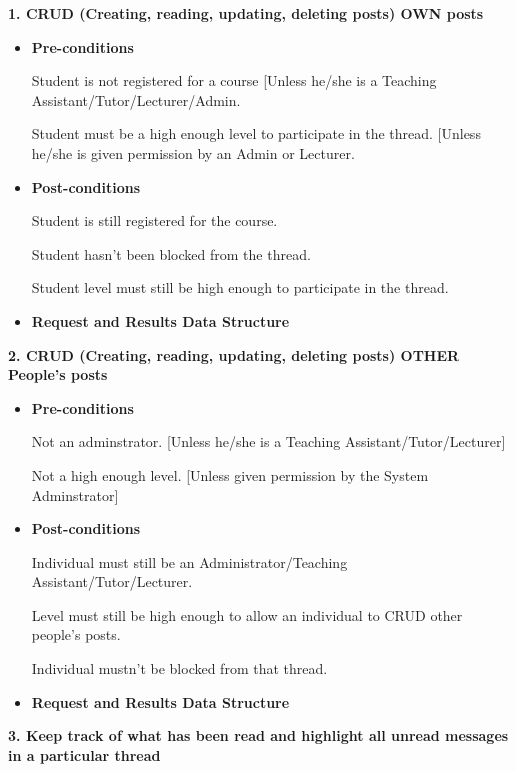 \documentclass[a4paper,12pt]{report}
\begin{document}
\textbf {1. CRUD (Creating, reading, updating, deleting posts) OWN posts}
\begin{itemize}
    \item\textbf{Pre-conditions}

	{ Student is not registered for a course [Unless he/she is a Teaching Assistant/Tutor/Lecturer/Admin.}

	{Student must be a high enough level to participate in the thread. [Unless he/she is given permission by an Admin or Lecturer.}
 
    \item\textbf{Post-conditions }

	{Student is still registered for the course.}

	{Student hasn't been blocked from the thread.}

	{Student level must still be high enough to participate in the thread.} 

    \item\textbf{Request and Results Data Structure} 

\end{itemize}
\textbf {2. CRUD (Creating, reading, updating, deleting posts) OTHER People's posts}
\begin{itemize}
    \item\textbf{Pre-conditions}

	{Not an adminstrator. [Unless he/she is a Teaching Assistant/Tutor/Lecturer]}

	{Not a high enough level. [Unless given permission by the System Adminstrator]}
 
    \item\textbf{Post-conditions }

	{Individual must still be an Administrator/Teaching Assistant/Tutor/Lecturer.}

	{Level must still be high enough to allow an individual to CRUD other people's posts.}

	{Individual mustn't be blocked from that thread.}


    \item\textbf{Request and Results Data Structure} 

\end{itemize}
\textbf {3. Keep track of what has been read and highlight all unread messages in a particular thread}
\end{document}
